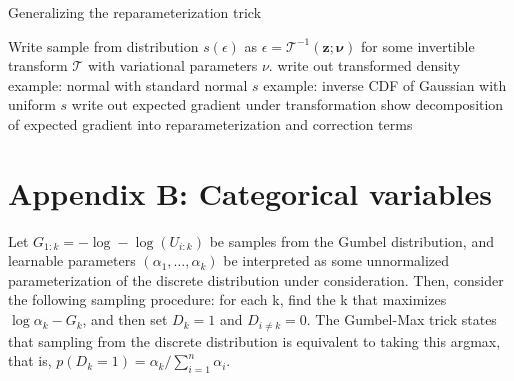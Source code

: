 \documentclass{article}
\begin{document}




\par{Generalizing the reparameterization trick}

Write sample from distribution $s(\epsilon)$ as $\epsilon = \mathcal{T}^{-1}(\mathbf{z}; \mathbf{\nu})$ for some invertible transform $\mathcal{T}$ with variational parameters $\nu$.
write out transformed density
example: normal with standard normal $s$
example: inverse CDF of Gaussian with uniform $s$
write out expected gradient under transformation
show decomposition of expected gradient into reparameterization and correction terms 






\section{Appendix B: Categorical variables}

Let $G_{1:k} = -\log-\log(U_{i:k})$ be samples from the Gumbel distribution, and learnable parameters $(\alpha_1, \dots, \alpha_k)$ be interpreted as some unnormalized parameterization of the discrete distribution under consideration.
Then, consider the following sampling procedure: for each k, find the k that maximizes $\log \alpha_k - G_k$, and then set $D_k=1$ and $D_{i \neq k} = 0$. The Gumbel-Max trick states that sampling from the discrete distribution is equivalent to taking this argmax, that is, $p(D_k = 1) = \alpha_k / \sum_{i=1}^n \alpha_i$.
\end{document}
